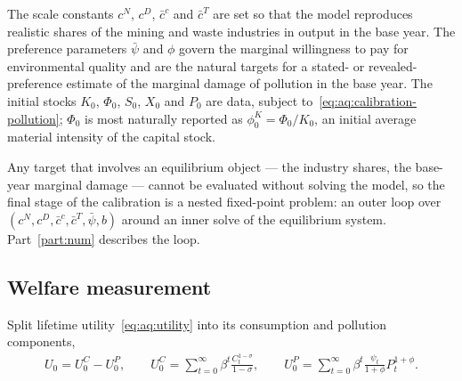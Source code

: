  The scale constants $c^N$, $c^D$, $\bar c^c$ and $\bar c^T$ are set so that the model reproduces realistic shares of the mining and waste industries in output in the base year. The preference parameters $\bar\psi$ and $\phi$ govern the marginal willingness to pay for environmental quality and are the natural targets for a stated- or revealed-preference estimate of the marginal damage of pollution in the base year. The initial stocks $K_0$, $\Phi_0$, $S_0$, $X_0$ and $P_0$ are data, subject to~\eqref{eq:aq:calibration-pollution}; $\Phi_0$ is most naturally reported as $\phi^K_0=\Phi_0/K_0$, an initial average material intensity of the capital stock.

 Any target that involves an equilibrium object --- the industry shares, the base-year marginal damage --- cannot be evaluated without solving the model, so the final stage of the calibration is a nested fixed-point problem: an outer loop over $\left(c^N,c^D,\bar c^c,\bar c^T,\bar\psi,b\right)$ around an inner solve of the equilibrium system. Part~\ref{part:num} describes the loop.

\subsection{Welfare measurement}
\label{subsec:aq:welfare}

Split lifetime utility~\eqref{eq:aq:utility} into its consumption and pollution components,
\begin{align}
U_0 = U^C_0-U^P_0,
\qquad
U^C_0 = \sum_{t=0}^{\infty}\beta^t\frac{C_t^{1-\sigma}}{1-\sigma},
\qquad
U^P_0 = \sum_{t=0}^{\infty}\beta^t\frac{\psi_t}{1+\phi}P_t^{1+\phi}.
\label{eq:aq:welfare-split}
\end{align}

